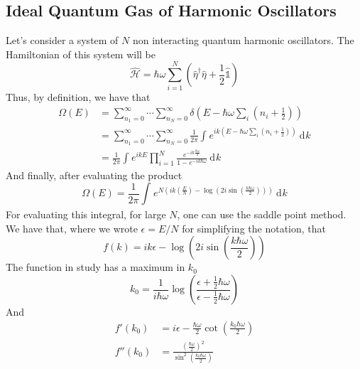 \documentclass[a4paper, 11pt]{book}
\newcommand{\1}{\opr{\mathds{1}}}
\newcommand{\diff}[2][]{\ \mathrm{d}^{#1}#2}
\newcommand{\ham}{\mathcal{H}}
\newcommand{\opr}[1]{\hat{#1}}
\newcommand{\adj}[2][]{#2^{\dagger#1}}
\theoremstyle{plain}
\begin{document}
		\subsection{Ideal Quantum Gas of Harmonic Oscillators}
		Let's consider a system of $N$ non interacting quantum harmonic oscillators. The Hamiltonian of this system will be
		\begin{equation}
			\opr{\ham}=\hbar\omega\sum_{i=1}^N\left( \adj{\opr{\eta}}\opr{\eta}+\frac{1}{2}\1 \right)
			\label{eq:nqhohamqms}
		\end{equation}
		Thus, by definition, we have that
		\begin{equation}
			\begin{aligned}
				\Omega(E)&=\sum_{n_1=0}^{\infty}\cdots\sum_{n_N=0}^{\infty}\delta\left( E-\hbar\omega\sum_i\left( n_i+\frac{1}{2} \right) \right)\\
				&=\sum_{n_1=0}^{\infty}\cdots\sum_{n_N=0}^{\infty}\frac{1}{2\pi}\int_{}^{}e^{ik\left( E-\hbar\omega\sum_i\left( n_i+\frac{1}{2} \right) \right)}\diff{k}\\
				&=\frac{1}{2\pi}\int_{}^{}e^{ikE}\prod_{i=1}^{N}\frac{e^{-ik\frac{\hbar\omega}{2}}}{1-e^{-ik\hbar\omega}}\diff{k}
			\end{aligned}
			\label{eq:omegaeqho}
		\end{equation}
		And finally, after evaluating the product
		\begin{equation}
			\Omega(E)=\frac{1}{2\pi}\int_{}^{}e^{N\left( ik\left( \frac{E}{N} \right)-\log\left( 2i\sin\left( \frac{k\hbar\omega}{2} \right) \right) \right)}\diff{k}
			\label{eq:finalomegaeqho}
		\end{equation}
		For evaluating this integral, for large $N$, one can use the saddle point method.\\
		We have that, where we wrote $\epsilon=E/N$ for simplifying the notation, that
		\begin{equation*}
			f(k)=ik\epsilon-\log\left( 2i\sin\left( \frac{k\hbar\omega}{2} \right) \right)
		\end{equation*}
		The function in study has a maximum in $k_0$
		\begin{equation*}
			k_0=\frac{1}{i\hbar\omega}\log\left( \frac{\epsilon+\frac{1}{2}\hbar\omega}{\epsilon-\frac{1}{2}\hbar\omega} \right)
		\end{equation*}
		And
		\begin{equation*}
			\begin{aligned}
				f'(k_0)&=i\epsilon-\frac{\hbar\omega}{2}\cot\left( \frac{k_0\hbar\omega}{2} \right)\\
				f''(k_0)&=\frac{\left( \frac{\hbar\omega}{2} \right)^2}{\sin^2\left( \frac{k_0\hbar\omega}{2} \right)}
			\end{aligned}
		\end{equation*}
\end{document}
